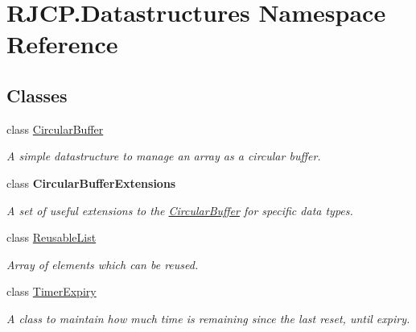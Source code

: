 \hypertarget{namespace_r_j_c_p_1_1_datastructures}{}\section{R\+J\+C\+P.\+Datastructures Namespace Reference}
\label{namespace_r_j_c_p_1_1_datastructures}
\subsection*{Classes}
\begin{DoxyCompactItemize}
\item 
class \mbox{\hyperlink{class_r_j_c_p_1_1_datastructures_1_1_circular_buffer}{Circular\+Buffer}}
\begin{DoxyCompactList}\small\item\em A simple datastructure to manage an array as a circular buffer. \end{DoxyCompactList}\item 
class {\bfseries Circular\+Buffer\+Extensions}
\begin{DoxyCompactList}\small\item\em A set of useful extensions to the \mbox{\hyperlink{class_r_j_c_p_1_1_datastructures_1_1_circular_buffer}{Circular\+Buffer}} for specific data types. \end{DoxyCompactList}\item 
class \mbox{\hyperlink{class_r_j_c_p_1_1_datastructures_1_1_reusable_list}{Reusable\+List}}
\begin{DoxyCompactList}\small\item\em Array of elements which can be reused. \end{DoxyCompactList}\item 
class \mbox{\hyperlink{class_r_j_c_p_1_1_datastructures_1_1_timer_expiry}{Timer\+Expiry}}
\begin{DoxyCompactList}\small\item\em A class to maintain how much time is remaining since the last reset, until expiry. \end{DoxyCompactList}\end{DoxyCompactItemize}
